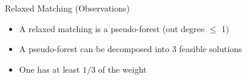 \begin{frame}{Relaxed Matching (Observations)}
\begin{itemize}
  \item A relaxed matching is a pseudo-forest (out degree $\leq$ 1)
  \item A pseudo-forest can be decomposed into 3 feasible solutions
  \item One has at least $1/3$ of the weight 
\end{itemize}
\centering

\end{frame}